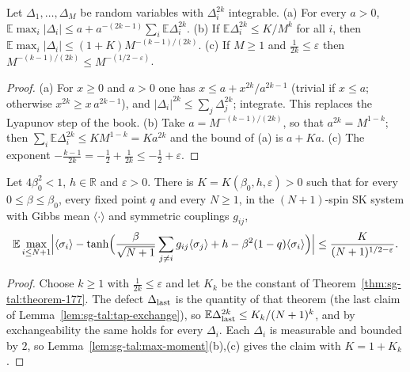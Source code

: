 \begin{lemma}
\label{lem:sg-tal:max-moment}
  \leanok
{}
Let $\Delta_1,\dots,\Delta_M$ be random variables with $\Delta_i^{2k}$ integrable.  (a) For every $a>0$, $\mathbb E\max_i|\Delta_i|\le a+a^{-(2k-1)}\sum_i\mathbb E\Delta_i^{2k}$.  (b) If $\mathbb E\Delta_i^{2k}\le K/M^k$ for all $i$, then $\mathbb E\max_i|\Delta_i|\le(1+K)M^{-(k-1)/(2k)}$.  (c) If $M\ge1$ and $\frac1{2k}\le\varepsilon$ then $M^{-(k-1)/(2k)}\le M^{-(1/2-\varepsilon)}$.
\end{lemma}
\begin{proof}
  \leanok
(a) For $x\ge0$ and $a>0$ one has $x\le a+x^{2k}/a^{2k-1}$ (trivial if $x\le a$; otherwise $x^{2k}\ge x\,a^{2k-1}$), and $|\Delta_i|^{2k}\le\sum_j\Delta_j^{2k}$; integrate.  This replaces the Lyapunov step of the book.  (b) Take $a=M^{-(k-1)/(2k)}$, so that $a^{2k}=M^{1-k}$; then $\sum_i\mathbb E\Delta_i^{2k}\le KM^{1-k}=Ka^{2k}$ and the bound of (a) is $a+Ka$.  (c) The exponent $-\frac{k-1}{2k}=-\frac12+\frac1{2k}\le-\frac12+\varepsilon$.
\end{proof}

\begin{theorem}
\label{cor:sg-tal:corollary-178}
  \leanok
{}
Let $4\beta_0^2<1$, $h\in\mathbb R$ and $\varepsilon>0$.  There is $K=K(\beta_0,h,\varepsilon)>0$ such that for every $0\le\beta\le\beta_0$, every fixed point $q$ and every $N\ge1$, in the $(N+1)$-spin SK system with Gibbs mean $\langle\cdot\rangle$ and symmetric couplings $g_{ij}$,
\[
\mathbb E\max_{i\le N+1}\Bigl|\langle\sigma_i\rangle-\tanh\Bigl(\frac\beta{\sqrt{N+1}}\sum_{j\ne i}g_{ij}\langle\sigma_j\rangle+h-\beta^2(1-q)\langle\sigma_i\rangle\Bigr)\Bigr|\le\frac K{(N+1)^{1/2-\varepsilon}}.
\]
\end{theorem}
\begin{proof}
  \leanok
Choose $k\ge1$ with $\frac1{2k}\le\varepsilon$ and let $K_k$ be the constant of Theorem~\ref{thm:sg-tal:theorem-177}.  The defect $\Delta_{\rm last}$ is the quantity of that theorem (the last claim of Lemma~\ref{lem:sg-tal:tap-exchange}), so $\mathbb E\Delta_{\rm last}^{2k}\le K_k/(N+1)^k$, and by exchangeability the same holds for every $\Delta_i$.  Each $\Delta_i$ is measurable and bounded by $2$, so Lemma~\ref{lem:sg-tal:max-moment}(b),(c) gives the claim with $K=1+K_k$.
\end{proof}

